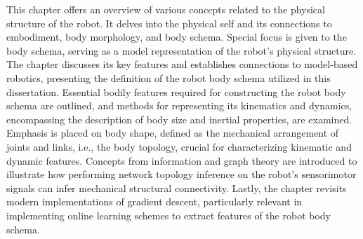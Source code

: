 This chapter offers an overview of various concepts related to the physical structure of the robot. It delves into the physical self and its connections to embodiment, body morphology, and body schema. Special focus is given to the body schema, serving as a model representation of the robot's physical structure. The chapter discusses its key features and establishes connections to model-based robotics, presenting the definition of the robot body schema utilized in this dissertation. Essential bodily features required for constructing the robot body schema are outlined, and methods for representing its kinematics and dynamics, encompassing the description of body size and inertial properties, are examined. Emphasis is placed on body shape, defined as the mechanical arrangement of joints and links, i.e., the body topology, crucial for characterizing kinematic and dynamic features. Concepts from information and graph theory are introduced to illustrate how performing network topology inference on the robot's sensorimotor signals can infer mechanical structural connectivity. Lastly, the chapter revisits modern implementations of gradient descent, particularly relevant in implementing online learning schemes to extract features of the robot body schema.

